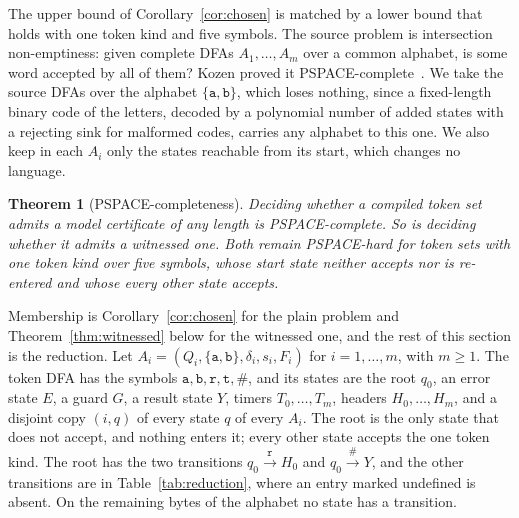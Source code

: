 \documentclass[11pt,a4paper]{article}
\theoremstyle{definition}
\theoremstyle{plain}
\newtheorem{theorem}{Theorem}
\newcommand{\code}[1]{\texttt{#1}}
\begin{document}
The upper bound of Corollary~\ref{cor:chosen} is matched by a lower bound that holds with one token kind and five
symbols. The source problem is intersection non-emptiness: given complete DFAs $A_1, \ldots, A_m$ over a common
alphabet, is some word accepted by all of them? Kozen proved it PSPACE-complete~\cite[Lemma~3.2.3,
p.~261]{kozen1977lower}. We take the source DFAs over the alphabet $\{\code{a}, \code{b}\}$, which loses nothing, since
a fixed-length binary code of the letters, decoded by a polynomial number of added states with a rejecting sink for
malformed codes, carries any alphabet to this one. We also keep in each $A_i$ only the states reachable from its start,
which changes no language.

\begin{theorem}[PSPACE-completeness]
\label{thm:pspace}
Deciding whether a compiled token set admits a model certificate of any length is PSPACE-complete. So is deciding
whether it admits a witnessed one. Both remain PSPACE-hard for token sets with one token kind over five symbols, whose
start state neither accepts nor is re-entered and whose every other state accepts.
\end{theorem}

Membership is Corollary~\ref{cor:chosen} for the plain problem and Theorem~\ref{thm:witnessed} below for the witnessed
one, and the rest of this section is the reduction. Let $A_i = (Q_i, \{\code{a}, \code{b}\}, \delta_i, s_i, F_i)$ for
$i = 1, \ldots, m$, with $m \geq 1$. The token DFA has the symbols $\code{a}, \code{b}, \code{r}, \code{t}, \code{\#}$,
and its states are the root $q_0$, an error state $E$, a guard $G$, a result state $Y$, timers $T_0, \ldots, T_m$,
headers $H_0, \ldots, H_m$, and a disjoint copy $(i, q)$ of every state $q$ of every $A_i$. The root is the only state
that does not accept, and nothing enters it; every other state accepts the one token kind. The root has the two
transitions $q_0 \xrightarrow{\code{r}} H_0$ and $q_0 \xrightarrow{\code{\#}} Y$, and the other transitions are in
Table~\ref{tab:reduction}, where an entry marked undefined is absent. On the remaining bytes of the alphabet no state
has a transition.
\end{document}
